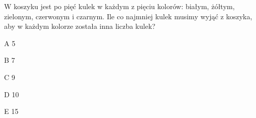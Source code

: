 \begin{tresc}
W koszyku jest po pięć kulek w każdym z pięciu kolorów: białym, żółtym, zielonym, czerwonym i czarnym. Ile co najmniej kulek musimy wyjąć z koszyka, aby w każdym kolorze została inna liczba kulek?
\end{tresc}
\begin{wariant}{A} 5 \end{wariant}
\begin{wariant}{B} 7 \end{wariant}
\begin{wariant}{C} 9 \end{wariant}
\begin{wariant}{D} 10 \end{wariant}
\begin{wariant}{E} 15 \end{wariant}
